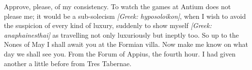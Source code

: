 

 Approve, please, of my consistency. To watch the games at Antium does not please me; it would be a sub-solecism \textit{[Greek: hyposoloikon]}, when I wish to avoid the suspicion of every kind of luxury, suddenly to show myself \textit{[Greek: anaphainesthai]} as travelling not only luxuriously but ineptly too. So up to the Nones of May I shall await you at the Formian villa. Now make me know on what day we shall see you. From the Forum of Appius, the fourth hour. I had given another a little before from Tres Tabernae.
